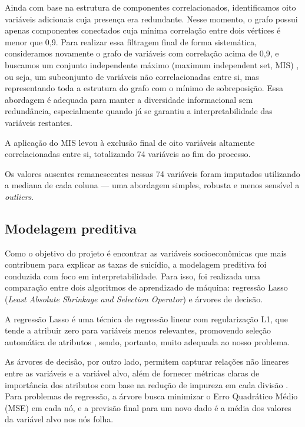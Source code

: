\documentclass[letterpaper]{article}
\begin{document}
Ainda com base na estrutura de componentes correlacionados, identificamos oito variáveis adicionais cuja presença era redundante. Nesse momento, o grafo possui apenas componentes conectados cuja mínima correlação entre dois vértices é menor que 0{,}9. Para realizar essa filtragem final de forma sistemática, consideramos novamente o grafo de variáveis com correlação acima de 0{,}9, e buscamos um conjunto independente máximo (maximum independent set, MIS) \cite{west2001introduction}, ou seja, um subconjunto de variáveis não correlacionadas entre si, mas representando toda a estrutura do grafo com o mínimo de sobreposição. Essa abordagem é adequada para manter a diversidade informacional sem redundância, especialmente quando já se garantiu a interpretabilidade das variáveis restantes.

A aplicação do MIS levou à exclusão final de oito variáveis altamente correlacionadas entre si, totalizando 74 variáveis ao fim do processo.

Os valores ausentes remanescentes nessas 74 variáveis foram imputados utilizando a mediana de cada coluna — uma abordagem simples, robusta e menos sensível a \textit{outliers}. 

\subsection*{Modelagem preditiva} %
Como o objetivo do projeto é encontrar as variáveis socioeconômicas que mais contribuem para explicar as taxas de suicídio, a modelagem preditiva foi conduzida com foco em interpretabilidade. Para isso, foi realizada uma comparação entre dois algoritmos de aprendizado de máquina: regressão Lasso (\textit{Least Absolute Shrinkage and Selection Operator}) e árvores de decisão.

A regressão Lasso é uma técnica de regressão linear com regularização L1, que tende a atribuir zero para variáveis menos relevantes, promovendo seleção automática de atributos \cite{tibshirani1996regression}, sendo, portanto, muito adequada ao nosso problema.

As árvores de decisão, por outro lado, permitem capturar relações não lineares entre as variáveis e a variável alvo, além de fornecer métricas claras de importância dos atributos com base na redução de impureza em cada divisão \cite{breiman1986classification}. Para problemas de regressão, a árvore busca minimizar o Erro Quadrático Médio (MSE) em cada nó, e a previsão final para um novo dado é a média dos valores da variável alvo nos nós folha.
\end{document}
